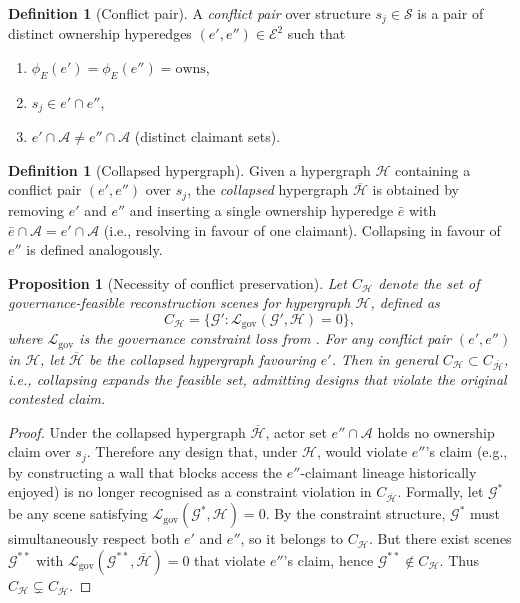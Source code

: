 \documentclass[11pt,a4paper]{article}
\theoremstyle{plain}
\newtheorem{proposition}[theorem]{Proposition}
\theoremstyle{definition}
\newtheorem{definition}[theorem]{Definition}
\theoremstyle{remark}
\newcommand{\GS}{\mathcal{G}}
\newcommand{\HG}{\mathcal{H}}
\newcommand{\Struc}{\mathcal{S}}
\newcommand{\Act}{\mathcal{A}}
\newcommand{\Lgov}{\mathcal{L}_{\mathrm{gov}}}
\begin{document}
\begin{definition}[Conflict pair]
\label{def:conflict_pair}
A \emph{conflict pair} over structure $s_j \in \Struc$ is a pair of
distinct ownership hyperedges $(e', e'') \in \mathcal{E}^2$ such that
\begin{enumerate}[leftmargin=2.5em, label=(\roman*)]
  \item $\phi_E(e') = \phi_E(e'') = \mathrm{owns}$,
  \item $s_j \in e' \cap e''$,
  \item $e' \cap \Act \neq e'' \cap \Act$ (distinct claimant sets).
\end{enumerate}
\end{definition}

\begin{definition}[Collapsed hypergraph]
\label{def:collapsed}
Given a hypergraph $\HG$ containing a conflict pair $(e', e'')$
over $s_j$, the \emph{collapsed} hypergraph $\overline{\HG}$ is
obtained by removing $e'$ and $e''$ and inserting a single ownership
hyperedge $\bar{e}$ with $\bar{e} \cap \Act = e' \cap \Act$ (i.e.,
resolving in favour of one claimant). Collapsing in favour of $e''$
is defined analogously.
\end{definition}

\begin{proposition}[Necessity of conflict preservation]
\label{prop:conflict_necessity}
Let $C_{\HG}$ denote the set of governance-feasible reconstruction
scenes for hypergraph $\HG$, defined as
\[
  C_{\HG} = \bigl\{\GS' : \Lgov(\GS', \HG) = 0\bigr\},
\]
where $\Lgov$ is the governance constraint loss from .
For any conflict pair $(e', e'')$ in $\HG$, let $\overline{\HG}$ be
the collapsed hypergraph favouring $e'$. Then in general
$C_{\HG} \subset C_{\overline{\HG}}$, i.e., collapsing expands the
feasible set, admitting designs that violate the original contested claim.
\end{proposition}

\begin{proof}
Under the collapsed hypergraph $\overline{\HG}$, actor set
$e'' \cap \Act$ holds no ownership claim over $s_j$. Therefore any
design that, under $\HG$, would violate $e''$'s claim (e.g., by
constructing a wall that blocks access the $e''$-claimant lineage
historically enjoyed) is no longer recognised as a constraint violation
in $C_{\overline{\HG}}$. Formally, let $\GS^*$ be any scene satisfying
$\Lgov(\GS^*, \HG) = 0$. By the constraint structure, $\GS^*$ must
simultaneously respect both $e'$ and $e''$, so it belongs to
$C_{\HG}$. But there exist scenes $\GS^{**}$ with
$\Lgov(\GS^{**}, \overline{\HG}) = 0$ that violate $e''$'s claim,
hence $\GS^{**} \notin C_{\HG}$. Thus $C_{\HG} \subsetneq
C_{\overline{\HG}}$.
\end{proof}
\end{document}
